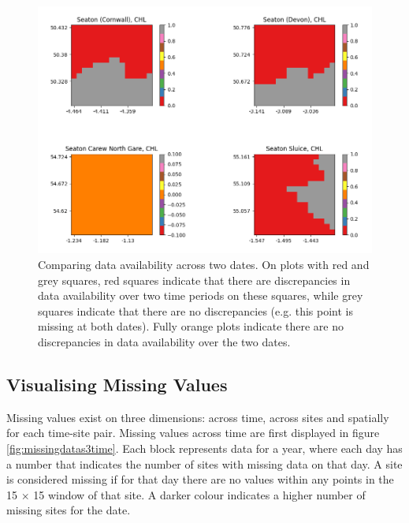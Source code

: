 \documentclass[a4paper,11pt]{report}
\begin{document}
\begin{figure}[H]
    \centering
    \includegraphics[scale=0.7]{images/2d_plots_difference.png}
    \caption{Comparing data availability across two dates. On plots with red and grey squares, red squares indicate that there are discrepancies in data availability over two time periods on these squares, while grey squares indicate that there are no discrepancies (e.g. this point is missing at both dates). Fully orange plots indicate there are no discrepancies in data availability over the two dates. }
    \label{fig:coastline_shift}
\end{figure}

\subsection{Visualising Missing Values}

Missing values exist on three dimensions: across time, across sites and spatially for each time-site pair. Missing values across time are first displayed in figure \ref{fig:missingdatas3time}. Each block represents data for a year, where each day has a number that indicates the number of sites with missing data on that day. A site is considered missing if for that day there are no values within any points in the 15 $\times$ 15 window of that site. A darker colour indicates a higher number of missing sites for the date.
\end{document}
